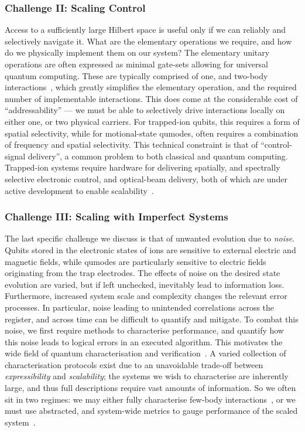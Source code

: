 \subsubsection{Challenge II: Scaling Control}
Access to a sufficiently large Hilbert
space is useful only if we can reliably and selectively navigate it.
What are the elementary operations we require, and how do we
physically implement them on our system? The elementary unitary operations 
are often expressed as minimal gate-sets allowing for universal quantum computing.
These are typically comprised of one, and two-body
interactions~\cite{divincenzo_two-bit_1995,
kitaev_quantum_1997,braunstein_quantum_2005,lloyd_quantum_1999}, which greatly
simplifies the elementary operation, and the required number of implementable
interactions. This does come at the considerable cost of
``addressability'' --- we must be able to selectively drive interactions locally
on either one, or two physical carriers. For trapped-ion qubits, this requires a
form of spatial selectivity, while for motional-state qumodes, often requires a combination of
frequency and spatial selectivity. This technical constraint is that of
``control-signal delivery'', a common problem to both classical and quantum
computing. Trapped-ion systems require hardware for delivering spatially, and spectrally selective electronic control, and optical-beam
delivery, both of which are under active development to enable
scalability~\cite{malinowski_how_2023,mehta_integrated_2020}.

\subsubsection{Challenge III: Scaling with Imperfect Systems}
The last specific challenge we discuss is that of unwanted evolution due to \emph{noise}.
Qubits stored in the electronic states of ions are sensitive to external electric
and magnetic fields, while qumodes are particularly sensitive to electric fields originating from the trap electrodes. The effects of noise on the desired
state evolution are varied, but
if left unchecked, inevitably lead to information loss. 
Furthermore, increased system scale and complexity changes the relevant error
processes. In particular, noise leading to unintended correlations across the register, and across time can be difficult to quantify and mitigate.
To combat this noise, we first require methods to characterise performance, and
quantify how this noise leads to logical errors in an executed algorithm.
This motivates the wide field of
quantum characterisation and verification~\cite{eisert_quantum_2020,
hashim_benchmarking_2023}. A varied collection of characterisation protocols
exist due to an unavoidable trade-off between \emph{expressibility} and
\emph{scalability}; the systems we wish to characterise are inherently large,
and thus full descriptions require vast amounts of information. So we often sit
in two regimes: we may either fully characterise few-body
interactions~\cite{chuang_prescription_1997}, or we must use abstracted, and
system-wide metrics to gauge performance of the scaled
system~\cite{erhard_characterizing_2019,mckay_benchmarking_2023-1}.

